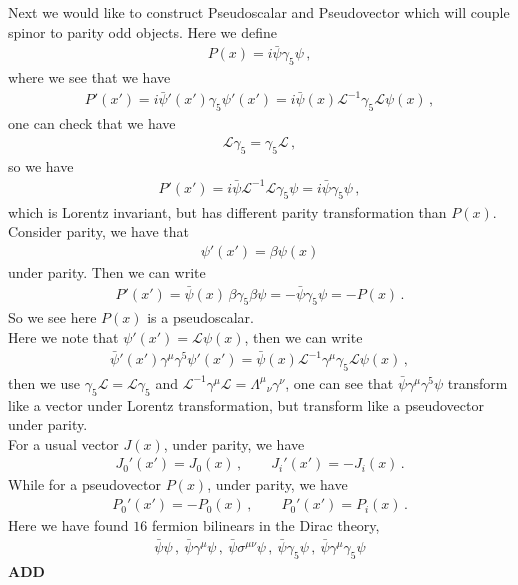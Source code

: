 \documentclass[11pt, onesided]{book}
\theoremstyle{break}
\theoremstyle{break}
\begin{document}
Next we would like to construct Pseudoscalar and Pseudovector which will couple spinor to parity odd objects. Here we define
\begin{align*}
P(x) = i \bar{\psi} \gamma_5 \psi \,,
\end{align*}
where we see that we have
\begin{align*}
P'(x') = i\bar{\psi}'(x') \gamma_5 \psi'(x') = i\bar{\psi}(x) \mathcal{L}^{-1} \gamma_5 \mathcal{L}\psi(x)\,,
\end{align*}
one can check that we have
\begin{align*}
\mathcal{L}\gamma_5 = \gamma_5 \mathcal{L}\,,
\end{align*}
so we have
\begin{align*}
P'(x') = i \bar{\psi} \mathcal{L}^{-1}\mathcal{L}\gamma_5 \psi =i \bar{\psi} \gamma_5 \psi\,,
\end{align*}
which is Lorentz invariant, but has different parity transformation than $P(x)$. Consider parity, we have that
\begin{align*}
\psi'(x') = \beta \psi(x)
\end{align*}
under parity. Then we can write
\begin{align*}
P'(x') = \bar{\psi}(x) \, \beta \gamma_5 \beta \psi = -\bar{\psi}\gamma_5 \psi = -P(x)\,.
\end{align*}
So we see here $P(x)$ is a pseudoscalar. \\


Here we note that $\psi'(x') = \mathcal{L}\psi(x)$, then we can write
\begin{align*}
\bar{\psi}'(x')\gamma^\mu \gamma^5 \psi'(x') = \bar{\psi}(x) \mathcal{L}^{-1} \gamma^\mu \gamma_5 \mathcal{L}\psi(x)\,,
\end{align*}
then we use $\gamma_5 \mathcal{L} = \mathcal{L}\gamma_5$ and $\mathcal{L}^{-1} \gamma^\mu \mathcal{L} = \Lambda^{\mu}{}_{\nu}\gamma^\nu$, one can see that
$\bar{\psi}\gamma^\mu \gamma^5\psi$ transform like a vector under Lorentz transformation, but transform like a pseudovector under parity. \\

For a usual vector $J(x)$, under parity, we have
\begin{align*}
J_0'(x') = J_0(x) \,,\qquad 
J_i'(x') = -J_i(x)\,.
\end{align*}
While for a pseudovector $P(x)$, under parity, we have
\begin{align*}
P_0'(x') = -P_0(x)\,,\qquad
P_0'(x') = P_i(x)\,.
\end{align*}
Here we have found $16$ fermion bilinears in the Dirac theory,
\begin{align*}
\bar{\psi}\psi\,,\
\bar{\psi}\gamma^\mu \psi\,,\
\bar{\psi}\sigma^{\mu\nu}\psi\,,\
\bar{\psi}\gamma_5\psi\,,\
\bar{\psi}\gamma^\mu \gamma_5 \psi
\end{align*}
\textbf{ADD}
\end{document}
